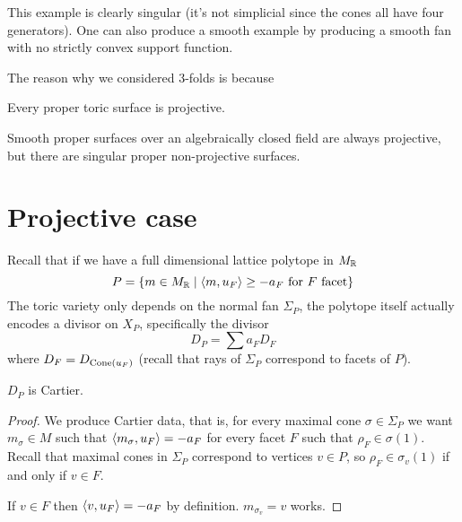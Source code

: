 \begin{remark}
This example is clearly singular (it's not simplicial since the cones all have four generators). One can also produce a smooth example by producing a smooth fan with no strictly convex support function.
\end{remark}

The reason why we considered 3-folds is because

\begin{fact}[]
Every proper toric surface is projective.
\end{fact}

\begin{fact}[]
Smooth proper surfaces over an algebraically closed field are always projective, but there are singular proper non-projective surfaces.
\end{fact}


\section{Projective case}
Recall that if we have a full dimensional lattice polytope in $M_{\mathbb{R}}$
\[P=\left\{{m\in M_{\mathbb{R}}\mid \left\langle {m,u_F}\right\rangle\geq -a_F\text{ for $F$ facet}}\right\}\]
The toric variety only depends on the normal fan $\Sigma_P$, the polytope itself actually encodes a divisor on $X_P$, specifically the divisor
\[D_P=\sum a_F D_{F}\]
where $D_F=D_{\operatorname{Cone}(u_F)}$ (recall that rays of $\Sigma_P$ correspond to facets of $P$).

\begin{proposition}[]\label{PrPolytopeGivesCartierDivisor}
$D_P$ is Cartier.
\end{proposition}
\begin{proof}
We produce Cartier data, that is, for every maximal cone $\sigma\in \Sigma_P$ we want $m_\sigma\in M$ such that $\left\langle {m_\sigma,u_F}\right\rangle=-a_F$ for every facet $F$ such that $\rho_F\in \sigma(1)$. Recall that maximal cones in $\Sigma_P$ correspond to vertices $v\in P$, so $\rho_F\in \sigma_v(1)$ if and only if $v\in F$.

If $v\in F$ then $\left\langle {v,u_F}\right\rangle=-a_F$ by definition. $m_{\sigma_v}=v$ works.
\end{proof}

